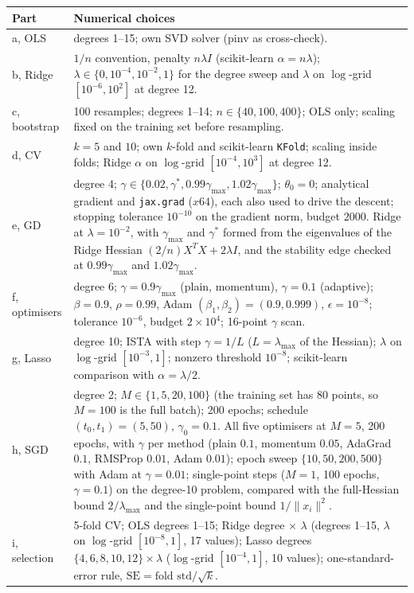 \documentclass[a4paper,11pt]{article}
\begin{document}
\begin{center}
\begin{tabular}{lp{10.5cm}}
\toprule
Part & Numerical choices \\
\midrule
a, OLS & degrees 1--15; own SVD solver (pinv as cross-check). \\
b, Ridge & $1/n$ convention, penalty $n\lambda I$ (scikit-learn $\alpha=n\lambda$); $\lambda\in\{0,10^{-4},10^{-2},1\}$ for the degree sweep and $\lambda$ on $\log$-grid $[10^{-6},10^{2}]$ at degree 12. \\
c, bootstrap & 100 resamples; degrees 1--14; $n\in\{40,100,400\}$; OLS only; scaling fixed on the training set before resampling. \\
d, CV & $k=5$ and $10$; own $k$-fold and scikit-learn \texttt{KFold}; scaling inside folds; Ridge $\alpha$ on $\log$-grid $[10^{-4},10^{3}]$ at degree 12. \\
e, GD & degree 4; $\gamma\in\{0.02,\gamma^\ast,0.99\gamma_{\max},1.02\gamma_{\max}\}$; $\theta_0=0$; analytical gradient and \texttt{jax.grad} ($x64$), each also used to drive the descent; stopping tolerance $10^{-10}$ on the gradient norm, budget $2000$. Ridge at $\lambda=10^{-2}$, with $\gamma_{\max}$ and $\gamma^\ast$ formed from the eigenvalues of the Ridge Hessian $(2/n)X^TX+2\lambda I$, and the stability edge checked at $0.99\gamma_{\max}$ and $1.02\gamma_{\max}$. \\
f, optimisers & degree 6; $\gamma=0.9\gamma_{\max}$ (plain, momentum), $\gamma=0.1$ (adaptive); $\beta=0.9$, $\rho=0.99$, Adam $(\beta_1,\beta_2)=(0.9,0.999)$, $\epsilon=10^{-8}$; tolerance $10^{-6}$, budget $2\times10^{4}$; 16-point $\gamma$ scan. \\
g, Lasso & degree 10; ISTA with step $\gamma=1/L$ ($L=\lambda_{\max}$ of the Hessian); $\lambda$ on $\log$-grid $[10^{-3},1]$; nonzero threshold $10^{-8}$; scikit-learn comparison with $\alpha=\lambda/2$. \\
h, SGD & degree 2; $M\in\{1,5,20,100\}$ (the training set has 80 points, so $M=100$ is the full batch); 200 epochs; schedule $(t_0,t_1)=(5,50)$, $\gamma_0=0.1$. All five optimisers at $M=5$, 200 epochs, with $\gamma$ per method (plain $0.1$, momentum $0.05$, AdaGrad $0.1$, RMSProp $0.01$, Adam $0.01$); epoch sweep $\{10,50,200,500\}$ with Adam at $\gamma=0.01$; single-point steps ($M=1$, 100 epochs, $\gamma=0.1$) on the degree-10 problem, compared with the full-Hessian bound $2/\lambda_{\max}$ and the single-point bound $1/\|x_i\|^2$. \\
i, selection & 5-fold CV; OLS degrees 1--15; Ridge degree $\times$ $\lambda$ (degrees 1--15, $\lambda$ on $\log$-grid $[10^{-8},1]$, 17 values); Lasso degrees $\{4,6,8,10,12\}\times\lambda$ ($\log$-grid $[10^{-4},1]$, 10 values); one-standard-error rule, $\mathrm{SE}=\text{fold std}/\sqrt{k}$. \\
\bottomrule
\end{tabular}
\end{center}



\end{document}
